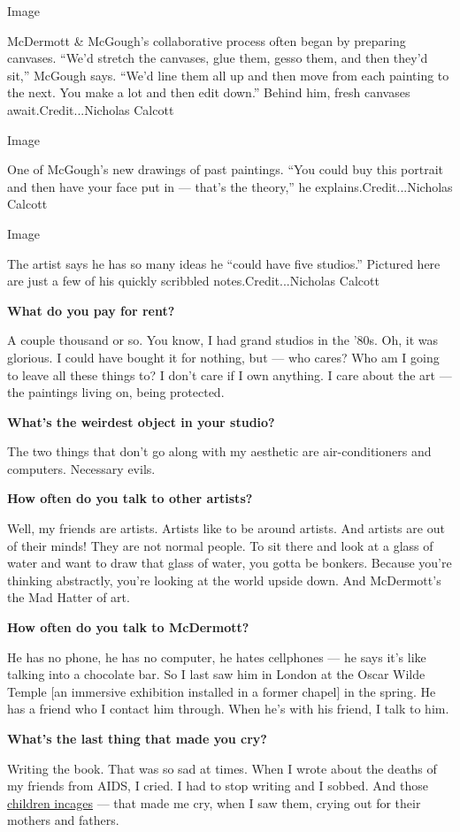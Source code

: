 Image

McDermott \& McGough's collaborative process often began by preparing
canvases. ``We'd stretch the canvases, glue them, gesso them, and then
they'd sit,'' McGough says. ``We'd line them all up and then move from
each painting to the next. You make a lot and then edit down.'' Behind
him, fresh canvases await.Credit...Nicholas Calcott

Image

One of McGough's new drawings of past paintings. ``You could buy this
portrait and then have your face put in --- that's the theory,'' he
explains.Credit...Nicholas Calcott

Image

The artist says he has so many ideas he ``could have five studios.''
Pictured here are just a few of his quickly scribbled
notes.Credit...Nicholas Calcott

\textbf{What do you pay for rent?}

A couple thousand or so. You know, I had grand studios in the '80s. Oh,
it was glorious. I could have bought it for nothing, but --- who cares?
Who am I going to leave all these things to? I don't care if I own
anything. I care about the art --- the paintings living on, being
protected.

\textbf{What's the weirdest object in your studio?}

The two things that don't go along with my aesthetic are
air-conditioners and computers. Necessary evils.

\textbf{How often do you talk to other artists?}

Well, my friends are artists. Artists like to be around artists. And
artists are out of their minds! They are not normal people. To sit there
and look at a glass of water and want to draw that glass of water, you
gotta be bonkers. Because you're thinking abstractly, you're looking at
the world upside down. And McDermott's the Mad Hatter of art.

\textbf{How often do you talk to McDermott?}

He has no phone, he has no computer, he hates cellphones --- he says
it's like talking into a chocolate bar. So I last saw him in London at
the Oscar Wilde Temple {[}an immersive exhibition installed in a former
chapel{]} in the spring. He has a friend who I contact him through. When
he's with his friend, I talk to him.

\textbf{What's the last thing that made you cry?}

Writing the book. That was so sad at times. When I wrote about the
deaths of my friends from AIDS, I cried. I had to stop writing and I
sobbed. And those
\href{https://www.nytimes3xbfgragh.onion/2019/07/02/us/politics/border-center-migrant-detention.html}{children
in}\href{https://www.nytimes3xbfgragh.onion/2019/07/02/us/politics/border-center-migrant-detention.html}{cages}
--- that made me cry, when I saw them, crying out for their mothers and
fathers.

